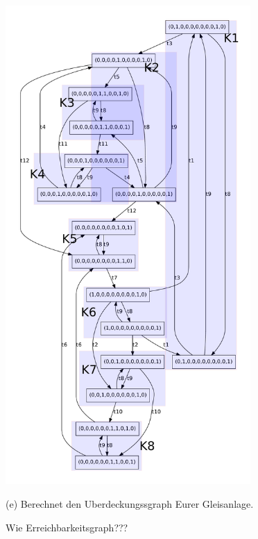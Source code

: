 \documentclass{scrreprt}
\begin{document}
\begin{enumerate}
\includegraphics[width=0.7\textwidth]{kg_easy.pdf}

(e) Berechnet den Uberdeckungssgraph Eurer Gleisanlage.

Wie Erreichbarkeitsgraph???

\end{enumerate}
\end{document}
